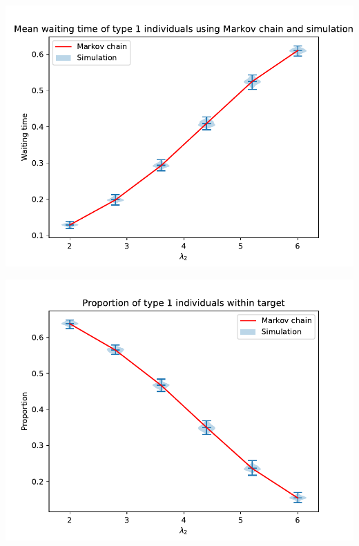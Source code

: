 \begin{frame}
\begin{multicols}{3}
        \columnbreak
        \includegraphics[scale=0.2]{Bin/performance_measures_comparison/waiting_1_comparison.pdf}

        \vspace{2.5cm}
        
        \includegraphics[scale=0.2]{Bin/performance_measures_comparison/proportion_1_comparison.pdf}
        

\end{multicols}
\end{frame}
